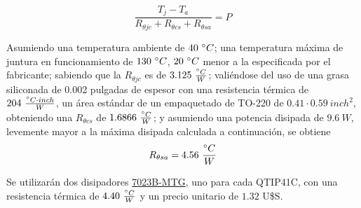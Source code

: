\begin{equation}
\frac{T_j - T_a}{R_{\theta jc}+R_{\theta cs}+R_{\theta sa}} = P
\end{equation}

Asumiendo una temperatura ambiente de $40 \ \degree C$; una temperatura máxima de juntura en funcionamiento de $130 \ \degree C$, $20 \ \degree C$ menor a la especificada por el fabricante; sabiendo que la $R_{\theta jc}$ es de $3.125 \ \frac{\degree C}{W}$; valiéndose del uso de una grasa siliconada de 0.002 pulgadas de espesor con una resistencia térmica de $204 \ \frac{\degree C \cdot inch}{W}$, un área estándar de un empaquetado de TO-220 de $0.41\cdot 0.59 \ inch^2$, obteniendo una $R_{\theta cs}$ de $1.6866 \ \frac{\degree C}{W}$; y asumiendo  una potencia disipada de $9.6 \ W$, levemente mayor a la máxima disipada calculada a continuación, se obtiene
\begin{equation}
R_{\theta sa} = 4.56 \ \frac{\degree C}{W}
\end{equation}

Se utilizarán dos disipadores \href{https://www.digikey.com/product-detail/en/aavid-thermal-division-of-boyd-corporation/7023B-MTG/HS410-ND/1625509}{7023B-MTG}, uno para cada QTIP41C, con una resistencia térmica de $4.40 \ \frac{\degree C}{W}$ y un precio unitario de $1.32$ U\$S.



